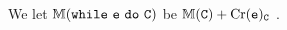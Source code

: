 




\begin{definition}%
    We let \(\sfm{\textnormal{\prc|while| $\comm{e}$ \prc|do| $\comm{C}$}}\) be \(\mathbb{M}(\mathtt{C}) + \mathrm{Cr}(\mathtt{e})_{\mathtt{C}}\)%
.
\end{definition}

